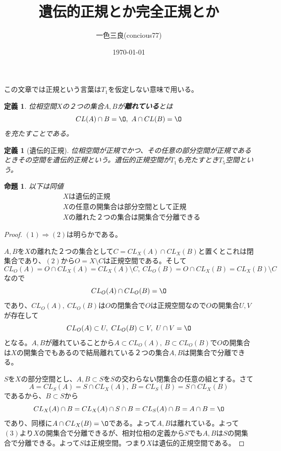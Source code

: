 \documentclass[leqno]{jsarticle}
\title{遺伝的正規とか完全正規とか}
\author{一色三良(concious77)}
\date{\today}
\newtheorem{prop}[thm]{命題}
\newtheorem{df}[thm]{定義}
\newcommand{\To}{\Longrightarrow}
\begin{document}
\maketitle
この文章では正規という言葉は$T_1$を仮定しない意味で用いる。
\begin{df}
位相空間$X$の２つの集合$A,B$が{\bf 離れている}とは
\[
CL(A)\cap B=\O,\ A\cap CL(B)=\O
\]
を充たすことである。
\end{df}
\begin{df}[遺伝的正規]
位相空間が正規でかつ、その任意の部分空間が正規であるときその空間を遺伝的正規という。遺伝的正規空間が$T_1$も充たすとき$T_5$空間という。
\end{df}
\begin{prop}
以下は同値
\begin{align}
&\mbox{$X$は遺伝的正規}\\
&\mbox{$X$の任意の開集合は部分空間として正規}\\
&\mbox{$X$の離れた２つの集合は開集合で分離できる}
\end{align}
\end{prop}
\begin{proof}
$(1)\To (2)$は明らかである。\par
[$(2)\To (3)$]\par
$A,B$を$X$の離れた２つの集合として$C=CL_X(A)\cap CL_X(B)$と置くとこれは閉集合であり、$(2)$から$O=X\setminus C$は正規空間である。そして
\[
CL_O(A)=O\cap CL_X(A)=CL_X(A)\setminus C,\ CL_O(B)=O\cap CL_X(B)=CL_X(B)\setminus C
\]
なので
\[
CL_O(A)\cap CL_O(B)=\O
\]
であり、$CL_O(A),\ CL_O(B)$は$O$の閉集合で$O$は正規空間なので$O$の開集合$U,V$が存在して
\[
CL_O(A)\subset U,\ CL_O(B)\subset V,\ U\cap V=\O
\]
となる。$A,B$が離れていることから$A\subset CL_O(A),\ B\subset CL_O(B)$で$O$の開集合は$X$の開集合でもあるので結局離れている２つの集合$A,B$は開集合で分離できる。\par
[$(2)\To(3)$の証明終わり]\par
[$(3)\To (1)$]\par
$S$を$X$の部分空間とし、$A,B\subset S$を$S$の交わらない閉集合の任意の組とする。さて
\[
A=CL_S(A)=S\cap CL_X(A),\ B=CL_S(B)=S\cap CL_X(B)
\]
であるから、$B\subset S$から
\[
CL_X(A)\cap B=CL_X(A)\cap S\cap B=CL_S(A)\cap B=A\cap B=\O
\]
であり、同様に$A\cap CL_X(B)=\O$である。よって$A,B$は離れている。よって$(3)$より$X$の開集合で分離できるが、相対位相の定義から$S$でも$A,B$は$S$の開集合で分離できる。よって$S$は正規空間。つまり$X$は遺伝的正規空間である。
\end{proof}
\setcounter{equation}{0}
\end{document}
